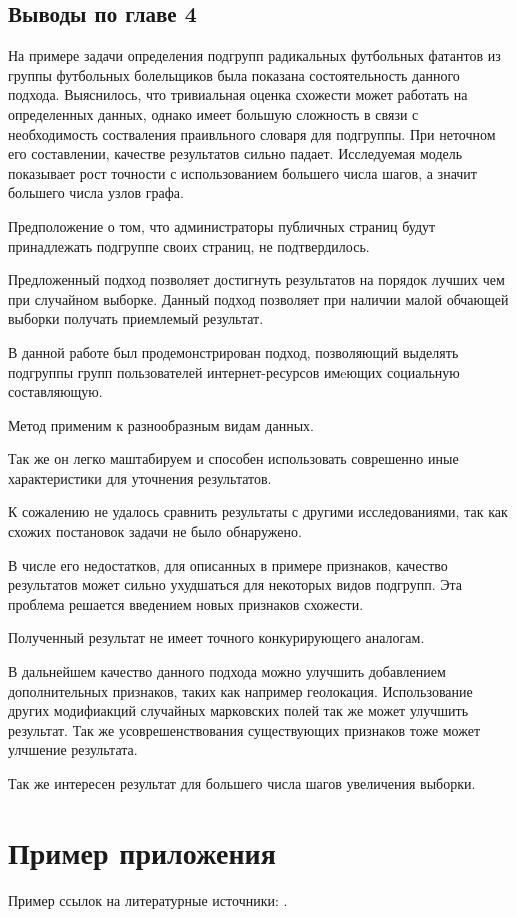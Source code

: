 \documentclass[annotation,times,page4]{itmo-student-thesis}
\begin{document}
\section{Выводы по главе 4}
На примере задачи определения подгрупп радикальных футбольных фатантов из группы футбольных болельщиков  была показана состоятельность данного подхода. Выяснилось, что тривиальная оценка схожести может работать на определенных данных, однако имеет большую сложность в связи с необходимость состваления праивльного словаря для подгруппы. При неточном его составлении, качестве результатов сильно падает. Исследуемая модель показывает рост точности с использованием большего числа шагов, а значит большего числа узлов графа. 

Предположение о том, что администраторы публичных страниц будут принадлежать подгруппе своих страниц, не подтвердилось. 

Предложенный подход позволяет достигнуть результатов на порядок лучших чем при случайном выборке.  
 Данный подход позволяет при наличии малой обчающей выборки получать приемлемый результат.


\chapterconclusion

\startconclusionpage

В данной работе был продемонстрирован подход, позволяющий выделять подгруппы групп пользователей интернет-ресурсов имeющих социальную составляющую.

Метод применим к разнообразным видам данных.

Так же он легко маштабируем и способен использовать соврешенно иные характеристики для уточнения результатов.

К сожалению не удалось сравнить результаты с другими исследованиями, так как схожих постановок задачи не было обнаружено.

В числе его недостатков, для описанных в примере признаков, качество результатов может сильно ухудшаться для некоторых видов подгрупп. Эта проблема решается введением новых признаков схожести.

Полученный результат не имеет точного конкурирующего аналогам.

В дальнейшем качество данного подхода можно улучшить добавлением дополнительных признаков, таких как например геолокация. Использование других модифиакций случайных марковских полей так же может улучшить результат. Так же усоврешенствования существующих признаков тоже может улчшение результата.

Так же интересен результат для большего числа шагов увеличения выборки.


\printbibliography[heading=trueHeading]

\appendix

\chapter{Пример приложения}

Пример ссылок на литературные источники: \cite{example-english, example-russian}.
\end{document}
